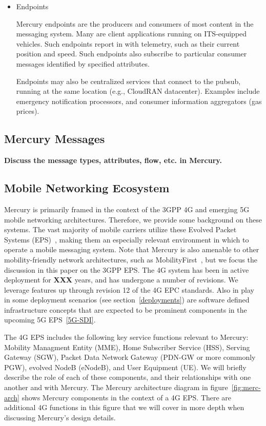 \begin{itemize}
\item Endpoints

Mercury endpoints are the producers and consumers of most content in
the messaging system. Many are client applications running on
ITS-equipped vehicles.  Such endpoints report in with telemetry, such
as their current position and speed.  Such endpoints also subscribe to
particular consumer messages identified by specified attributes.

Endpoints may also be centralized services that connect to the pubsub,
running at the same location (e.g., CloudRAN datacenter). Examples
include emergency notification processors, and consumer information
aggregators (gas prices).

\end{itemize}

\subsection{Mercury Messages}

{\bf Discuss the message types, attributes, flow, etc. in Mercury.}

\subsection{Mobile Networking Ecosystem}

Mercury is primarily framed in the context of the 3GPP 4G and emerging
5G mobile networking architectures. Therefore, we provide some
background on these systems.  The vast majority of mobile carriers
utilize these Evolved Packet Systems (EPS)~\cite{mobile-stats}, making
them an especially relevant environment in which to operate a mobile
messaging system.  Note that Mercury is also amenable to other
mobility-friendly network architectures, such as
MobilityFirst~\cite{mobility-first}, but we focus the discussion in
this paper on the 3GPP EPS.  The 4G system has been in active
deployment for {\bf XXX} years, and has undergone a number of
revisions. We leverage features up through revision 12 of the 4G EPC
standards.  Also in play in some deployment scenarios (see
section~\ref{deployments}) are software defined infrastructure
concepts that are expected to be prominent components in the upcoming
5G EPS~\ref{5G-SDI}.

The 4G EPS includes the following key service functions relevant to
Mercury: Mobility Managment Entity (MME), Home Subscriber Service
(HSS), Serving Gateway (SGW), Packet Data Network Gateway (PDN-GW or
more commonly PGW), evolved NodeB (eNodeB), and User Equipment (UE).
We will briefly describe the role of each of these components, and
their relationships with one another and with Mercury. The Mercury
architecture diagram in figure~\ref{fig:merc-arch} shows Mercury
components in the context of a 4G EPS.  There are additional 4G
functions in this figure that we will cover in more depth when
discussing Mercury's design details.

